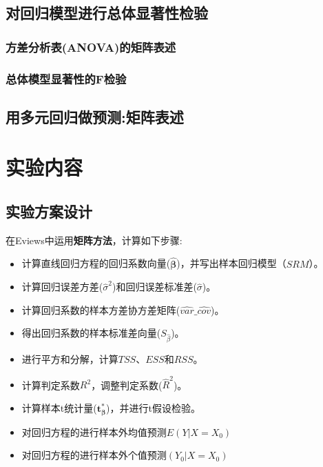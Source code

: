 \documentclass[12pt,(landscape,a4paper),(portrait,a4paper)]{article}
\providecommand{\tightlist}{%
  \setlength{\itemsep}{0pt}\setlength{\parskip}{0pt}}
\let\stdsection\section
\renewcommand\section{\newpage\stdsection}
\begin{document}
\subsection{对回归模型进行总体显著性检验}

\hypertarget{anova}{%
\subsubsection{方差分析表(ANOVA)的矩阵表述}\label{anova}}

\hypertarget{f}{%
\subsubsection{总体模型显著性的F检验}\label{f}}

\subsection{用多元回归做预测:矩阵表述}

\newpage

\section{实验内容}

\subsection{实验方案设计}

在Eviews中运用\textbf{矩阵方法}，计算如下步骤:

\begin{itemize}
\tightlist
\item
  计算直线回归方程的回归系数向量(\(\mathbf{\hat{\beta}}\))，并写出样本回归模型（\(SRM\)）。
\item
  计算回归误差方差(\(\hat{\sigma}^2\))和回归误差标准差(\(\hat{\sigma}\))。
\item
  计算回归系数的样本方差协方差矩阵(\(\widehat{var}\_\widehat{cov}\))。
\item
  得出回归系数的样本标准差向量(\(S_{\hat{\beta}}\))。
\item
  进行平方和分解，计算\(TSS\)、\(ESS\)和\(RSS\)。
\item
  计算判定系数\(R^2\)，调整判定系数(\(\hat{R}^2\))。
\item
  计算样本t统计量(\(\mathbf{t^{\ast}_{\beta}}\))，并进行t假设检验。
\item
  对回归方程的进行样本外均值预测\(E(Y|X=X_0)\)
\item
  对回归方程的进行样本外个值预测\((Y_0|X=X_0)\)
\end{itemize}
\end{document}
